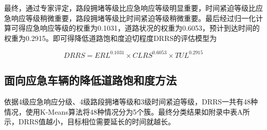 
最终，通过专家评定，路段拥堵等级比应急响应等级明显重要，时间紧迫等级比应急响应等级稍微重要，路段拥堵等级比时间紧迫等级稍微重要。最后经过归一化计算可得应急响应等级的权重为0.1031，道路状况的权重为0.6053，预计到达时间的权重为0.2915。即可得降低道路饱和度迫切程度DRRS的评估模型为

\begin{equation}
	\label{equation:DRRS}
	DRRS={ERL}^{0.1031}\times{CLRS}^{0.6053}\times{TUL}^{0.2915} 
\end{equation}

\subsection{面向应急车辆的降低道路饱和度方法}

依据4级应急响应分级、4级路段拥堵等级和3级时间紧迫等级，DRRS一共有48种情况，使用K-Means算法将48种情况分为5个簇。最终分类结果如附录中表A所示，DRRS值越小，目标相位需要延长的时间就越长。



